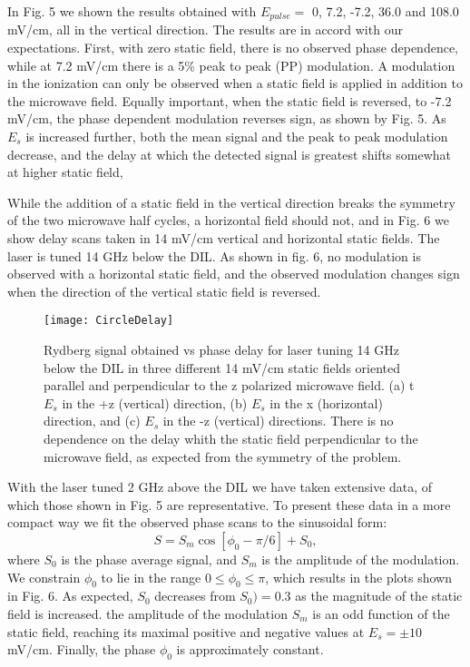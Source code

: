 \documentclass[aps,pra,preprint,groupedaddress]{revtex4-1}
\begin{document}
In Fig. 5 we shown the results obtained with $E_{pulse} =$ 0, 7.2, -7.2, 36.0 and 108.0 mV/cm, all in the vertical direction. The results are in accord with our expectations. First, with zero static field, there is no observed phase dependence, while at 7.2 mV/cm there is a 5\% peak to peak (PP) modulation. A modulation in the ionization can only be observed when a static field is applied in addition to the microwave field. Equally important, when the static field is reversed, to -7.2 mV/cm, the phase dependent modulation reverses sign, as shown by Fig. 5. As $E_s$ is increased further, both the mean signal and the peak to peak modulation decrease, and the delay at which the detected signal is greatest shifts somewhat at higher static field,


While the addition of a static field in the vertical direction breaks the symmetry of the two microwave half cycles, a horizontal field should not, and in Fig. 6 we show delay scans taken in 14 mV/cm vertical and horizontal static fields. The laser is tuned 14 GHz below the DIL. As shown in fig. 6, no modulation is observed with a horizontal static field, and the observed modulation changes sign when the direction of the vertical static field is reversed.


\begin{figure}
	\texttt{[image: CircleDelay]}
	\caption{Rydberg signal obtained vs phase delay for laser tuning 14 GHz below the DIL in three different 14 mV/cm static fields oriented parallel and perpendicular to the z polarized microwave field. (a) t$E_s$ in the +z (vertical) direction, (b) $E_s$ in the x (horizontal) direction, and (c) $E_s$ in the -z (vertical) directions. There is no dependence on the delay whith the static field perpendicular to the microwave field, as expected from the symmetry of the problem. }
	\label{fig:CircleDelay}
\end{figure}


With the laser tuned 2 GHz above the DIL we have taken extensive data, of which those shown in Fig. 5 are representative. To present these data in a more compact way we fit the observed phase scans to the sinusoidal form:
\begin{equation} \label{eq:modfit}
S = S_m  \cos{[ \phi_0-\pi/6]} + S_0,
\end{equation}
where $S_0$ is the phase average signal, and $S_m$ is the amplitude of the modulation. We constrain $\phi_0$ to lie in the range $0\leq \phi_0\leq \pi$, which results in the plots shown in Fig. 6. As expected, $S_0$ decreases from $S_0)=0.3$  as the magnitude of the static field is increased. the amplitude of the modulation $S_m$ is an odd function of the static field, reaching its maximal positive and negative values at $E_s=\pm 10$mV/cm. Finally, the phase $\phi_0$ is approximately constant.
\end{document}
